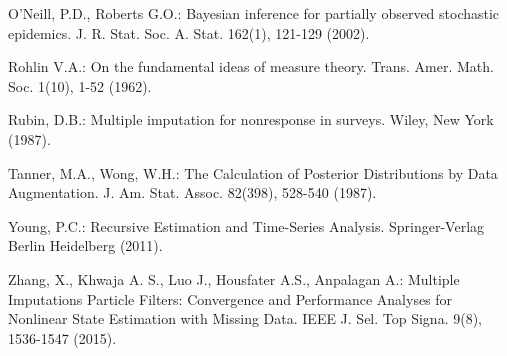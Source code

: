 \begin{thebibliography}{}
O'Neill, P.D., Roberts G.O.: Bayesian inference for partially observed stochastic epidemics. J. R. Stat. Soc. A. Stat. 162(1), 121-129 (2002).

Rohlin V.A.: On the fundamental ideas of measure theory.  Trans.
Amer. Math. Soc. 1(10), 1-52 (1962).

Rubin, D.B.: Multiple imputation for nonresponse in surveys. Wiley, New York (1987).

Tanner, M.A., Wong, W.H.: The Calculation of Posterior Distributions by Data Augmentation. J. Am. Stat. Assoc. 82(398), 528-540 (1987).

Young, P.C.: Recursive Estimation and Time-Series Analysis. Springer-Verlag Berlin Heidelberg (2011).

Zhang, X., Khwaja A. S., Luo J., Housfater A.S., Anpalagan A.: Multiple Imputations Particle Filters: Convergence and Performance Analyses for Nonlinear State Estimation with Missing Data. IEEE J. Sel. Top Signa. 9(8), 1536-1547 (2015).

\end{thebibliography}


\clearpage
\appendix

